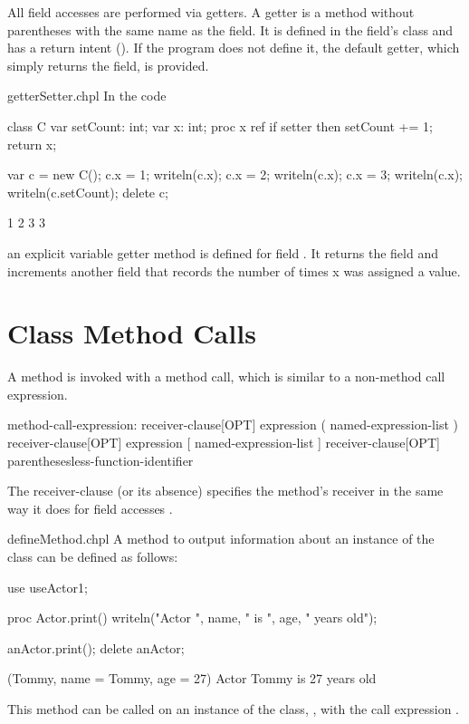 All field accesses are performed via getters.  A getter is a method without
parentheses with the same name as the field. It is defined in the field's class
and has a  return intent ().  If the program
does not define it, the default getter, which simply returns the field, is
provided.

\begin{chapelexample}{getterSetter.chpl}
In the code
\begin{chapel}
class C {
  var setCount: int;
  var x: int;
  proc x ref {
    if setter then
      setCount += 1;
    return x;
  }
}
\end{chapel}
\begin{chapelpost}
var c = new C();
c.x = 1;
writeln(c.x);
c.x = 2;
writeln(c.x);
c.x = 3;
writeln(c.x);
writeln(c.setCount);
delete c;
\end{chapelpost}
\begin{chapeloutput}
1
2
3
3
\end{chapeloutput}
an explicit variable getter method is defined for field .  It
returns the field  and increments another field that records
the number of times x was assigned a value.
\end{chapelexample}

\section{Class Method Calls}
\label{Class_Method_Calls}

A method is invoked with a method call, which is similar to a non-method
call expression.

\begin{syntax}
method-call-expression:
  receiver-clause[OPT] expression ( named-expression-list )
  receiver-clause[OPT] expression [ named-expression-list ]
  receiver-clause[OPT] parenthesesless-function-identifier
\end{syntax}

The receiver-clause (or its absence) specifies the method's receiver
 in the same way it does for field accesses
.

\begin{chapelexample}{defineMethod.chpl}
A method to output information about an instance of the 
class can be defined as follows:
\begin{chapelpre}
use useActor1;
\end{chapelpre}
\begin{chapel}
proc Actor.print() {
  writeln("Actor ", name, " is ", age, " years old");
}
\end{chapel}
\begin{chapelpost}
anActor.print();
delete anActor;
\end{chapelpost}
\begin{chapeloutput}
(Tommy, {name = Tommy, age = 27})
Actor Tommy is 27 years old
\end{chapeloutput}
This method can be called on an instance of the 
class, , with the call expression .
\end{chapelexample}

